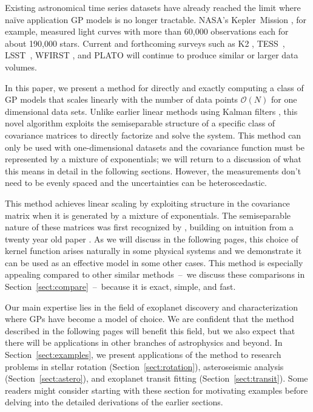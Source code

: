 \documentclass[manuscript, letterpaper]{aastex6}
\newcommand{\project}[1]{\textsf{#1}}
\newcommand{\kepler}{\project{Kepler}}
\newcommand{\lsst}{\project{LSST}}
\newcommand{\tess}{\project{TESS}}
\newcommand{\sectionname}{Section}
\newcommand{\sectref}[1]{\ref{sect:#1}}
\newcommand{\Sect}[1]{\sectionname~\sectref{#1}}
\newcommand{\sect}[1]{\Sect{#1}}
\newcommand{\response}[1]{{\color{blue}#1}}
\begin{document}
\response{Existing astronomical time series datasets have already reached the
limit where na\"ive application GP models is no longer tractable.
NASA's \kepler\ Mission \citep{Borucki:2010}, for example, measured light
curves with more than 60,000 observations each for about 190,000 stars.
Current and forthcoming surveys such as \project{K2} \citep{Howell:2014},
\tess\ \citep{Ricker:2014}, \lsst\ \citep{Ivezic:2008}, \project{WFIRST}
\citep{Spergel:2015}, and PLATO \citep{Rauer:2014} will continue to produce
similar or larger data volumes.}

In this paper, we present a method for directly and exactly computing a class
of GP models that scales linearly with the number of data points
$\mathcal{O}(N)$ for one dimensional data sets.
\response{Unlike earlier linear methods using Kalman filters \citep[for
example,][]{Kelly:2014}, this novel algorithm exploits the semiseparable
structure of a specific class of covariance matrices to directly factorize and
solve the system.
}
This method can only be used with one-dimensional datasets and the covariance
function must be represented by a mixture of exponentials; we will return to a
discussion of what this means in detail in the following sections.
However, the measurements don't need to be evenly spaced and the uncertainties
can be heteroscedastic.

This method achieves linear scaling by exploiting structure in the covariance
matrix when it is generated by a mixture of exponentials.
\response{The semiseparable nature of these matrices was first recognized by
\citet{Ambikasaran:2015}, building on intuition from a twenty year old paper
\citep{Rybicki:1995}.}
As we will discuss in the following pages, this choice of kernel function
arises naturally in some physical systems and we demonstrate it can be used as
an effective model in some other cases.
This method is especially appealing compared to other similar methods~--~we
discuss these comparisons in \sect{compare}~--~because it is exact, simple,
and fast.

Our main expertise lies in the field of exoplanet discovery and
characterization where GPs have become a model of choice.
We are confident that the method described in the following pages will benefit
this field, but we also expect that there will be applications in other
branches of astrophysics and beyond.
In \sect{examples}, we present applications of the method to research problems
in stellar rotation (\sect{rotation}), asteroseismic analysis (\sect{astero}),
and exoplanet transit fitting (\sect{transit}).
Some readers might consider starting with these section for motivating
examples before delving into the detailed derivations of the earlier sections.
\end{document}
